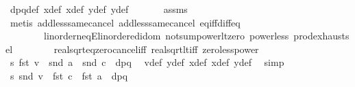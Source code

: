 \begin{isabellebody}
\ dpq{\isacharunderscore}{\kern0pt}def\ x{}{\isacharunderscore}{\kern0pt}def\ x{}{\isacharunderscore}{\kern0pt}def\ y{}{\isacharunderscore}{\kern0pt}def\ y{}{\isacharunderscore}{\kern0pt}def\ \isanewline
\ \ \ \ \isamarkupfalse%
\ assms\isanewline
\ \ \ \ \isamarkupfalse%
\ {\isacharparenleft}{\kern0pt}metis\ add{\isacharunderscore}{\kern0pt}less{\isacharunderscore}{\kern0pt}same{\isacharunderscore}{\kern0pt}cancel{}\ add{\isacharunderscore}{\kern0pt}less{\isacharunderscore}{\kern0pt}same{\isacharunderscore}{\kern0pt}cancel{}\ eq{\isacharunderscore}{\kern0pt}iff{\isacharunderscore}{\kern0pt}diff{\isacharunderscore}{\kern0pt}eq{\isacharunderscore}{\kern0pt}{}\isanewline
\ \ \ \ \ \ \ \ linorder{\isacharunderscore}{\kern0pt}neqE{\isacharunderscore}{\kern0pt}linordered{\isacharunderscore}{\kern0pt}idom\ not{\isacharunderscore}{\kern0pt}sum{\isacharunderscore}{\kern0pt}power{}{\isacharunderscore}{\kern0pt}lt{\isacharunderscore}{\kern0pt}zero\ power{}{\isacharunderscore}{\kern0pt}less{\isacharunderscore}{\kern0pt}{}\ prod{\isachardot}{\kern0pt}exhaust{\isacharunderscore}{\kern0pt}sel\isanewline
\ \ \ \ \ \ \ \ real{\isacharunderscore}{\kern0pt}sqrt{\isacharunderscore}{\kern0pt}eq{\isacharunderscore}{\kern0pt}zero{\isacharunderscore}{\kern0pt}cancel{\isacharunderscore}{\kern0pt}iff\ real{\isacharunderscore}{\kern0pt}sqrt{\isacharunderscore}{\kern0pt}lt{\isacharunderscore}{\kern0pt}{}{\isacharunderscore}{\kern0pt}iff\ zero{\isacharunderscore}{\kern0pt}less{\isacharunderscore}{\kern0pt}power{}{\isacharparenright}{\kern0pt}\isanewline
\isanewline
\ \ \isamarkupfalse%
\ s{\isacharunderscore}{\kern0pt}{}{\isacharcolon}{\kern0pt}\ {\isachardoublequoteopen}fst\ v\ {\isacharequal}{\kern0pt}\ {\isacharparenleft}{\kern0pt}snd\ a\ {\isacharminus}{\kern0pt}\ snd\ c{\isacharparenright}{\kern0pt}\ {\isacharslash}{\kern0pt}\ dpq{\isachardoublequoteclose}\ \isamarkupfalse%
\ v{\isacharunderscore}{\kern0pt}def\ y{}{\isacharunderscore}{\kern0pt}def\ x{}{\isacharunderscore}{\kern0pt}def\ x{}{\isacharunderscore}{\kern0pt}def\ y{}{\isacharunderscore}{\kern0pt}def\ \isamarkupfalse%
\ simp\isanewline
\ \ \isamarkupfalse%
\ s{\isacharunderscore}{\kern0pt}{}{\isacharcolon}{\kern0pt}\ {\isachardoublequoteopen}snd\ v\ {\isacharequal}{\kern0pt}\ {\isacharparenleft}{\kern0pt}fst\ c\ {\isacharminus}{\kern0pt}\ fst\ a{\isacharparenright}{\kern0pt}\ {\isacharslash}{\kern0pt}\ dpq{\isachardoublequoteclose}\ \isamarkupfalse%

\end{isabellebody}
